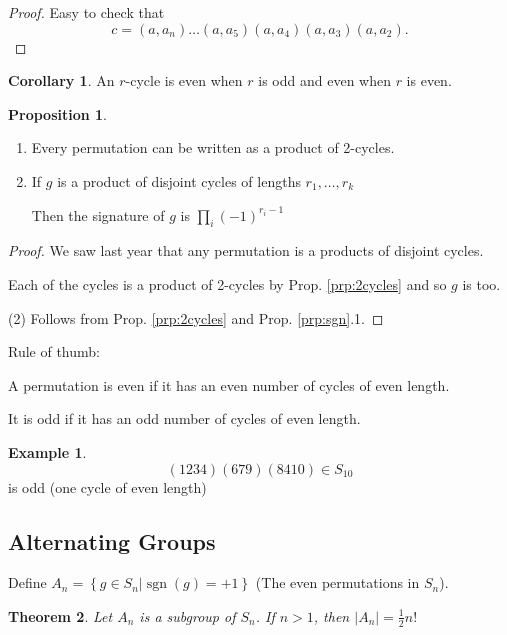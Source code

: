 \documentclass{article}
\newtheorem{theorem}{Theorem}
\theoremstyle{definition} \newtheorem*{definition}{Definition}
\newtheorem{proposition}[theorem]{Proposition}
\newtheorem*{corollary}{Corollary} \newtheorem*{remark}{Remark}
\newtheorem*{exmp}{Example} \newtheorem*{exmps}{Examples}
\DeclareMathOperator{\sgn}{sgn} \DeclareMathOperator{\id}{id}
\begin{document}
\begin{proof} Easy to check that
  $$c=(a,a_n)\ldots(a,a_5)(a,a_4)(a,a_3)(a,a_2).$$ \end{proof}

\begin{corollary} An $r$-cycle is even when $r$ is odd and even when $r$ is
  even.\\ \end{corollary}

\begin{proposition}\hfill \begin{enumerate} \item Every permutation can be
        written as a product of 2-cycles.  \item If $g$ is a product of
          disjoint cycles of lengths $r_1, \ldots, r_k$

      Then the signature of $g$ is $\prod_{i} (-1)^{r_i - 1}$ \end{enumerate}
\end{proposition}

\begin{proof} We saw last year that any permutation is a products of disjoint
  cycles.

  Each of the cycles is a product of 2-cycles by Prop. \ref{prp:2cycles} and so
  $g$ is too.

  (2) Follows from Prop. \ref{prp:2cycles} and Prop. \ref{prp:sgn}.1.
\end{proof}

Rule of thumb:

A permutation is even if it has an even number of cycles of even length.

It is odd if it has an odd number of cycles of even length.\\

\begin{exmp} $$(1 2 3 4)(6 7 9)(8 4 10) \in S_{10}$$ is odd (one cycle of even
  length) \end{exmp}


\subsection{Alternating Groups}

Define $A_n=\left\{ g \in S_n | \sgn(g) = +1 \right\}$ (The even permutations
in $S_n$).\\

\begin{theorem} Let $A_n$ is a subgroup of $S_n$. If $n>1$, then
  $|A_n|=\frac{1}{2}n!$ \label{thm:subgroup} \end{theorem}
\end{document}
